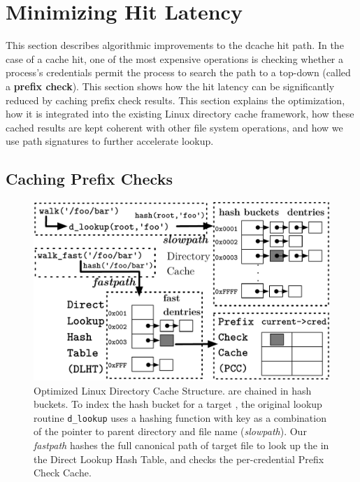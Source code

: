 \section{Minimizing Hit Latency}
\label{sec:dcache}

This section describes
algorithmic improvements to the dcache hit path.  
In the case of a cache hit, one of the most expensive operations
is checking whether 
a process's credentials permit the process to search
the path to a \dentry{} top-down (called a {\bf prefix check}).
This section shows how the hit latency can be significantly reduced
by caching prefix check results.
This section explains the optimization, how it is integrated into the existing Linux directory cache 
framework, how these cached results are kept coherent with other file system operations,
and how we use path signatures to further accelerate lookup.



\subsection{Caching Prefix Checks}
\label{sec:dcache:prefixcheck}

\begin{figure}[t!]
\includegraphics[width=1.0\linewidth]{dcache/figures/dcache-structure.pdf}
\footnotesize
\caption{
Optimized Linux Directory Cache Structure. \dentries{} are chained in hash buckets. To index the hash bucket for a target \dentry{}, the original lookup routine {\tt d\_lookup} uses a hashing function with key as a combination of the pointer to parent directory and file name ({\em slowpath}).
Our {\em fastpath} hashes the full canonical path of target file to look up the \dentry{}
in the Direct Lookup Hash Table,
and checks the per-credential Prefix Check Cache.}
\label{fig:dcache}
\end{figure}

